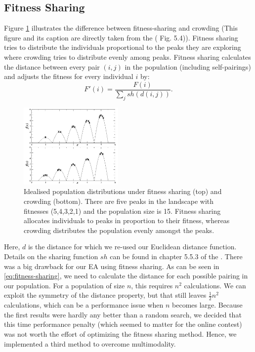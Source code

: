 \subsection{Fitness Sharing}
Figure \ref{fitness-sharing-vs-crowding} illustrates the difference between fitness-sharing and
crowding ({\small This figure and its caption are directly taken from the \book ({\footnotesize
Fig.
5.4})}).
Fitness sharing tries to distribute the individuals proportional to the peaks they are exploring
where crowding tries to distribute evenly among peaks. Fitness sharing calculates the distance
between every pair $(i, j)$ in the population (including self-pairings) and adjusts the fitness for
every individual $i$ by:
\begin{equation}
\label{eq:fitness-sharing}F'(i) = \frac{F(i)}{\sum_{j}sh(d(i, j))}.
\end{equation}
\begin{figure}[ht]
    \centering
    \includegraphics[width=0.45\textwidth]{images/fitness-sharing-vs-crowding}
    \caption{Idealised population distributions under fitness sharing (top)
    and crowding (bottom).
    There are five peaks in the landscape with fitnesses (5,4,3,2,1) and the population size is 15.
    Fitness sharing allocates individuals to peaks in proportion to their fitness, whereas crowding
    distributes the population evenly amongst the peaks.}\label{fitness-sharing-vs-crowding}
\end{figure}
Here, $d$ is the distance for which we re-used our Euclidean distance function. Details on the
sharing function $sh$ can be found in chapter 5.5.3 of the \book. There was a big drawback for our
EA using fitness sharing. As can be seen in \eqref{eq:fitness-sharing}, we need to calculate the
distance for each possible pairing in our population. For a population of size $n$, this requires
$n^2$ calculations. We can exploit the symmetry of the distance property, but that still leaves
$\tfrac{1}{2}n^2$ calculations, which can be a performance issue when $n$ becomes large. Because
the first results were hardly any better than a random search, we decided that this time
performance penalty (which seemed to matter for the online contest) was not worth the effort of
optimizing the fitness sharing method. Hence, we implemented a third method to overcome
multimodality.

